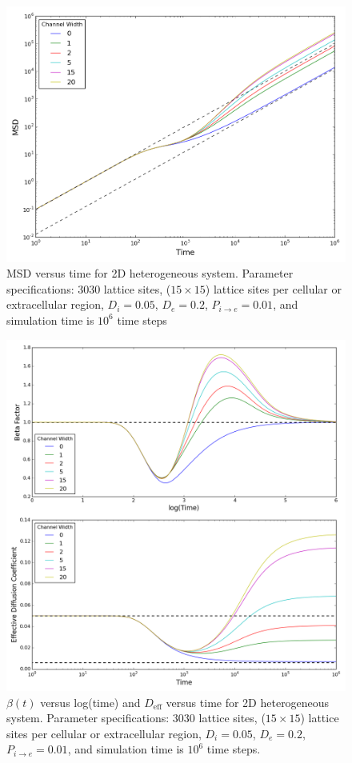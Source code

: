 	\begin{figure}[h]
		\centering
		\includegraphics[width=1.0\linewidth]{../images/2D/ye_msd_2D}
		\caption{MSD versus time for 2D heterogeneous system. Parameter specifications: 3030 lattice sites, ($ 15 \times 15 $) lattice sites per cellular or extracellular region, $ D_i = 0.05 $, $ D_e = 0.2 $, $ P_{i \rightarrow e} = 0.01 $, and simulation time is $ 10^6 $ time steps}
		\label{fig:ye_msd_2D}
	\end{figure}
	
	
	
	\begin{figure}[h]
		\centering
		\includegraphics[width=1.0\linewidth]{../images/2D/ye_beta_deff_2D}
		\caption{$ \beta (t) $ versus log(time) and $ D_\textrm{eff} $ versus time for 2D heterogeneous system. Parameter specifications: 3030 lattice sites, ($ 15 \times 15 $) lattice sites per cellular or extracellular region, $ D_i = 0.05 $, $ D_e = 0.2 $, $ P_{i \rightarrow e} = 0.01 $, and simulation time is $ 10^6 $ time steps.}
		\label{fig:ye_beta_deff_2D}
	\end{figure}

	